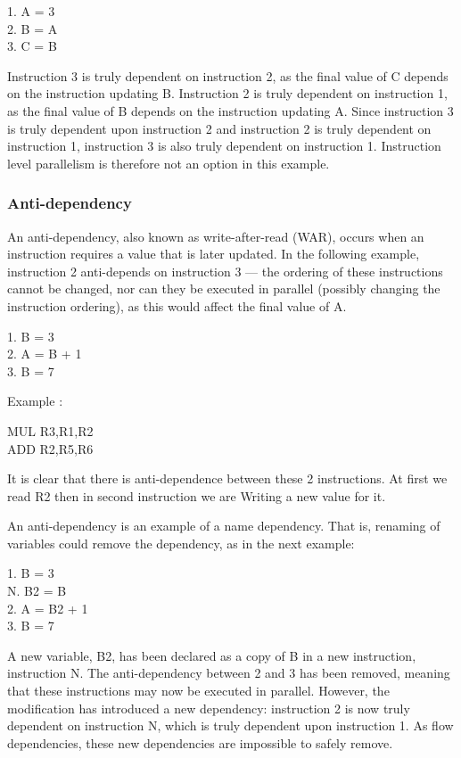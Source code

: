 \begin{center}
	1. A = 3\\
	2. B = A\\
	3. C = B
\end{center}
Instruction 3 is truly dependent on instruction 2, as the final value of C depends on the instruction updating B. Instruction 2 is truly dependent on instruction 1, as the final value of B depends on the instruction updating A. Since instruction 3 is truly dependent upon instruction 2 and instruction 2 is truly dependent on instruction 1, instruction 3 is also truly dependent on instruction 1. Instruction level parallelism is therefore not an option in this example.

\subsubsection{Anti-dependency}
An anti-dependency, also known as write-after-read (WAR), occurs when an instruction requires a value that is later updated. In the following example, instruction 2 anti-depends on instruction 3 — the ordering of these instructions cannot be changed, nor can they be executed in parallel (possibly changing the instruction ordering), as this would affect the final value of A.
\begin{center}
	1. B = 3 \\
	2. A = B + 1 \\
	3. B = 7
\end{center}

Example :
\begin{center}
	MUL R3,R1,R2 \\
	ADD R2,R5,R6
\end{center}
It is clear that there is anti-dependence between these 2 instructions. At first we read R2 then in second instruction we are Writing a new value for it.

An anti-dependency is an example of a name dependency. That is, renaming of variables could remove the dependency, as in the next example:
\begin{center}
	1. B = 3 \\
	N. B2 = B \\
	2. A = B2 + 1 \\
	3. B = 7
\end{center}
A new variable, B2, has been declared as a copy of B in a new instruction, instruction N. The anti-dependency between 2 and 3 has been removed, meaning that these instructions may now be executed in parallel. However, the modification has introduced a new dependency: instruction 2 is now truly dependent on instruction N, which is truly dependent upon instruction 1. As flow dependencies, these new dependencies are impossible to safely remove.

